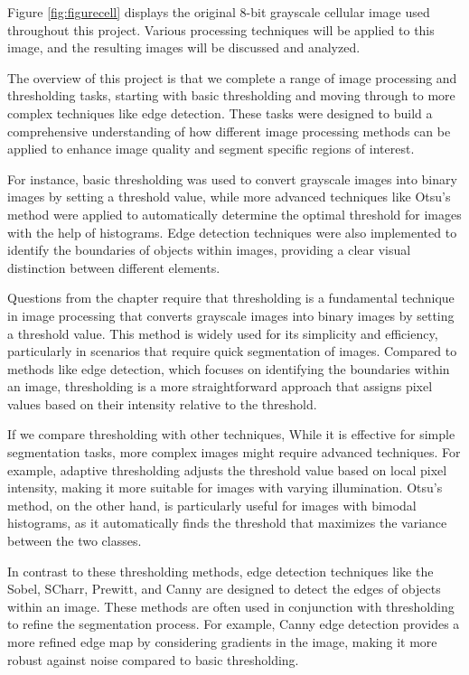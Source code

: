 \documentclass[%
	a4paper, %
	12pt, %
	english, %
	bibtotoc %
]{scrartcl}
\begin{document}
Figure \ref{fig:figurecell} displays the original 8-bit grayscale cellular image used throughout this project. Various processing techniques will be applied to this image, and the resulting images will be discussed and analyzed.

The overview of this project is that we complete a range of image processing and thresholding tasks, starting with basic thresholding and moving through to more complex techniques like edge detection. These tasks were designed to build a comprehensive understanding of how different image processing methods can be applied to enhance image quality and segment specific regions of interest.

For instance, basic thresholding was used to convert grayscale images into binary images by setting a threshold value, while more advanced techniques like Otsu’s method were applied to automatically determine the optimal threshold for images with the help of histograms. Edge detection techniques were also implemented to identify the boundaries of objects within images, providing a clear visual distinction between different elements.

Questions from the chapter require that thresholding is a fundamental technique in image processing that converts grayscale images into binary images by setting a threshold value. This method is widely used for its simplicity and efficiency, particularly in scenarios that require quick segmentation of images. Compared to methods like edge detection, which focuses on identifying the boundaries within an image, thresholding is a more straightforward approach that assigns pixel values based on their intensity relative to the threshold.

If we compare thresholding with other techniques, While it is effective for simple segmentation tasks, more complex images might require advanced techniques. For example, adaptive thresholding adjusts the threshold value based on local pixel intensity, making it more suitable for images with varying illumination. Otsu's method, on the other hand, is particularly useful for images with bimodal histograms, as it automatically finds the threshold that maximizes the variance between the two classes.

In contrast to these thresholding methods, edge detection techniques like the Sobel, SCharr, Prewitt, and Canny are designed to detect the edges of objects within an image. These methods are often used in conjunction with thresholding to refine the segmentation process. For example, Canny edge detection provides a more refined edge map by considering gradients in the image, making it more robust against noise compared to basic thresholding.
\end{document}
